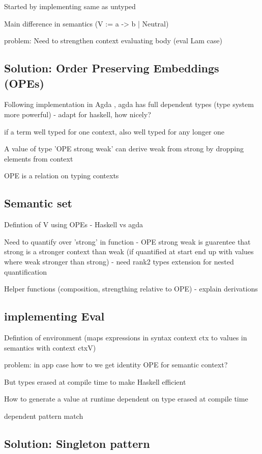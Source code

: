 Started by implementing same as untyped

Main difference in semantics (V := a -> b | Neutral) 
\cite{slides}

problem: Need to strengthen context evaluating body (eval Lam case)
\subsection{Solution: Order Preserving Embeddings (OPEs)}

Following implementation in Agda \cite{AgdaNbe}, agda has full dependent types (type system more powerful) - adapt for haskell, how nicely? 

if a term well typed for one context, also well typed for any longer one

A value of type 'OPE strong weak' can derive weak from strong by dropping elements from context

OPE is a relation on typing contexts

\subsection{Semantic set}

Defintion of V using OPEs - Haskell vs agda

Need to quantify over 'strong' in function - OPE strong weak is guarentee that strong is a stronger context than weak (if quantified at start end up with values where weak stronger than strong) - need rank2 types extension for nested quantification

Helper functions (composition, strengthing relative to OPE) - explain derivations

\subsection{implementing Eval}

Defintion of environment (maps expressions in syntax context ctx to values in semantics with context ctxV)

problem: in app case how to we get identity OPE for semantic context?

But types erased at compile time to make Haskell efficient

How to generate a value at runtime dependent on type erased at compile time

dependent pattern match \cite{SingletonsGuide}

\subsection{Solution: Singleton pattern}

